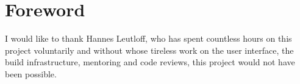 \documentclass[a4paper,11pt]{article}
\begin{document}
    \tableofcontents

    \pagebreak
    
    \section{Foreword}
        I would like to thank Hannes Leutloff, who has spent countless hours
        on this project voluntarily and without whose tireless work on
        the user interface, the build infrastructure, mentoring and code reviews, 
        this project would not have been possible.

    
    
    
    
    
    

    \pagebreak

    

    \pagebreak
    
    \listoffigures
    \listoftables
    
    
    
    
\end{document}
